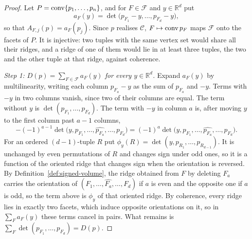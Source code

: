 \begin{proof}
  Let $P = \operatorname{conv}\{p_{1}, \ldots, p_{n}\}$, and for $F \in \mathcal{F}$ and
  $y \in \mathbb{R}^{d}$ put
  \[
    a_{F}(y) = \det\bigl(p_{F_{1}} - y, \ldots, p_{F_{d}} - y\bigr),
  \]
  so that $A_{F,j}(p) = a_{F}(p_{j})$. Since $p$ realises $\mathcal{C}$,
  $F \mapsto \operatorname{conv} p_{F}$ maps $\mathcal{F}$ onto the facets of $P$. It is
  injective: two tuples with the same vertex set would share all their
  ridges, and a ridge of one of them would lie in at least three tuples,
  the two and the other tuple at that ridge, against coherence.

  \emph{Step 1: $D(p) = \sum_{F \in \mathcal{F}} a_{F}(y)$ for every
  $y \in \mathbb{R}^{d}$.} Expand $a_{F}(y)$ by multilinearity, writing each
  column $p_{F_{a}} - y$ as the sum of $p_{F_{a}}$ and $-y$. Terms with $-y$
  in two columns vanish, since two of their columns are equal. The term
  without $y$ is $\det(p_{F_{1}}, \ldots, p_{F_{d}})$. The term with $-y$ in
  column $a$ is, after moving $y$ to the first column past $a - 1$ columns,
  \[
    -(-1)^{a-1}\det\bigl(y, p_{F_{1}}, \ldots, \widehat{p_{F_{a}}}, \ldots,
    p_{F_{d}}\bigr)
    = (-1)^{a}\det\bigl(y, p_{F_{1}}, \ldots, \widehat{p_{F_{a}}}, \ldots,
    p_{F_{d}}\bigr).
  \]
  For an ordered $(d-1)$-tuple $R$ put
  $\phi_{y}(R) = \det(y, p_{R_{1}}, \ldots, p_{R_{d-1}})$. It is unchanged
  by even permutations of $R$ and changes sign under odd ones, so it is a
  function of the oriented ridge that changes sign when the orientation is
  reversed. By Definition~\ref{def:signed-volume}, the ridge obtained from
  $F$ by deleting $F_{a}$ carries the orientation of
  $(F_{1}, \ldots, \widehat{F_{a}}, \ldots, F_{d})$ if $a$ is even and the
  opposite one if $a$ is odd, so the term above is $\phi_{y}$ of that
  oriented ridge. By coherence, every ridge lies in exactly two facets,
  which induce opposite orientations on it, so in $\sum_{F} a_{F}(y)$ these
  terms cancel in pairs. What remains is
  $\sum_{F} \det(p_{F_{1}}, \ldots, p_{F_{d}}) = D(p)$.


\end{proof}
